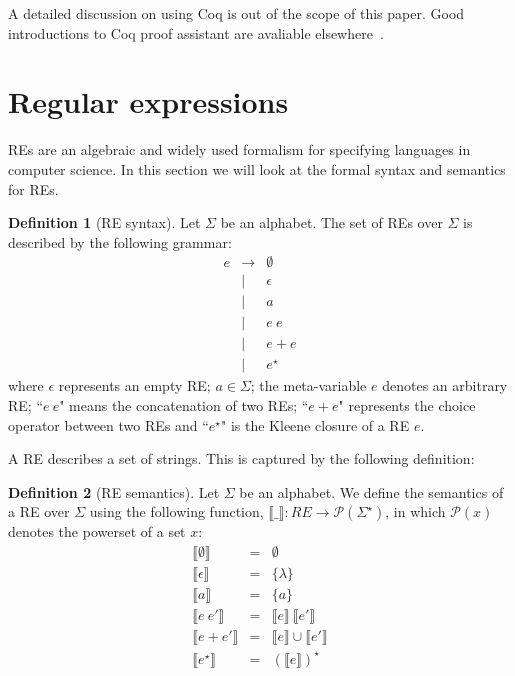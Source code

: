 \documentclass[oneside,12pt]{scrbook}
\theoremstyle{definition}
\newcommand{\sembrackets}[1]{\ensuremath{\llbracket #1 \rrbracket}}
\theoremstyle{plain}
\theoremstyle{definition}
\newtheorem{Definition}{Definition}
\begin{document}
A detailed discussion on using Coq is out of the scope of this paper. Good introductions
to Coq proof assistant are avaliable elsewhere~\cite{Bertot2010,Chlipala13}.

\section{Regular expressions}\label{section:res}

REs are an algebraic and widely used formalism for specifying languages in computer science.
In this section we will look at the formal syntax and semantics for REs.

\begin{Definition}[RE syntax]
	\label{REexpressionsyntax}
  Let $\Sigma$ be an alphabet. The set of REs over $\Sigma$ is described by the following grammar:
  \begin{equation*}
    \begin{array}{lcl}
      e & \to  & \emptyset \\
        & \mid & \epsilon  \\
        & \mid & a         \\
        & \mid & e \: e    \\
        & \mid & e + e     \\
        & \mid & e^\star
    \end{array}
  \end{equation*}
  where $\epsilon$ represents an empty RE; $a\in\Sigma$; the meta-variable $e$ denotes an arbitrary RE; ``$e\:e$" means the concatenation of two REs; ``$e + e$" represents the choice operator between two REs and ``$e^\star$" is the Kleene closure of a RE $e$.
\end{Definition}

A RE describes a set of strings. This is captured by the following definition:

\begin{Definition}[RE semantics]
  Let $\Sigma$ be an alphabet. We define the semantics of a RE over $\Sigma$
  using the following function, $\sembrackets{\_} : RE \to
  \mathcal{P}(\Sigma^\star)$, in which $\mathcal{P}(x)$ denotes the powerset of a set $x$:
  \begin{equation*}
    \begin{array}{lcl}
      \sembrackets{\emptyset} & = & \emptyset \\
      \sembrackets{\epsilon}  & = & \{\lambda\} \\
      \sembrackets{a}         & = & \{a\} \\
      \sembrackets{e\:e'}     & = & \sembrackets{e}\:\sembrackets{e'} \\
      \sembrackets{e + e'}    & = & \sembrackets{e}\cup\sembrackets{e'} \\
      \sembrackets{e^\star}   & = & (\sembrackets{e})^\star \\
    \end{array}
  \end{equation*}
\end{Definition}
\end{document}
